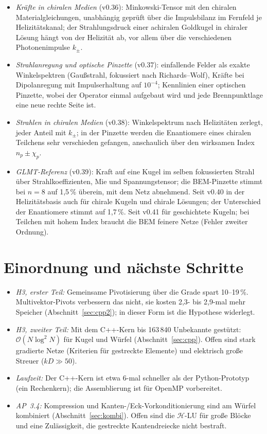 \documentclass[11pt, a4paper]{article}
\begin{document}
\begin{itemize}[leftmargin=*]
    Gold-Dimers aus einer Lösung; die chirale Kraft folgt dem Gradienten der optischen Chiralität mit dem aus der Kraftformel
    erwarteten Faktor auf 0,5\,\%.
  \item \emph{Kräfte in chiralen Medien} (v0.36): Minkowski-Tensor mit den chiralen Materialgleichungen, unabhängig geprüft über
    die Impulsbilanz im Fernfeld je Helizitätskanal; der Strahlungsdruck einer achiralen Goldkugel in chiraler Lösung hängt von
    der Helizität ab, vor allem über die verschiedenen Photonenimpulse $k_\pm$.
  \item \emph{Strahlanregung und optische Pinzette} (v0.37): einfallende Felder als exakte Winkelspektren (Gaußstrahl,
    fokussiert nach Richards--Wolf), Kräfte bei Dipolanregung mit Impulserhaltung auf $10^{-4}$; Kennlinien einer optischen
    Pinzette, wobei der Operator einmal aufgebaut wird und jede Brennpunktlage eine neue rechte Seite ist.
  \item \emph{Strahlen in chiralen Medien} (v0.38): Winkelspektrum nach Helizitäten zerlegt, jeder Anteil mit $k_\pm$; in der
    Pinzette werden die Enantiomere eines chiralen Teilchens sehr verschieden gefangen, anschaulich über den wirksamen Index
    $n_p \pm \chi_p$.
  \item \emph{GLMT-Referenz} (v0.39): Kraft auf eine Kugel im selben fokussierten Strahl über Strahlkoeffizienten, Mie und
    Spannungstensor; die BEM-Pinzette stimmt bei $n = 8$ auf 1,5\,\% überein, mit dem Netz abnehmend. Seit v0.40 in der
    Helizitätsbasis auch für chirale Kugeln und chirale Lösungen; der Unterschied der Enantiomere stimmt auf 1,7\,\%. Seit v0.41
    für geschichtete Kugeln; bei Teilchen mit hohem Index braucht die BEM feinere Netze (Fehler zweiter Ordnung).
\end{itemize}

\section{Einordnung und nächste Schritte}
\begin{itemize}[leftmargin=*]
  \item \emph{H3, erster Teil:} Gemeinsame Pivotisierung über die Grade spart
    10--19\,\%. Multivektor-Pivots verbessern das nicht, sie kosten 2,3- bis 2,9-mal mehr Speicher
    (Abschnitt~\ref{sec:cpp2}); in dieser Form ist die Hypothese widerlegt.
  \item \emph{H3, zweiter Teil:} Mit dem C++-Kern bis 163\,840 Unbekannte gestützt:
    $\mathcal{O}(N\log^2N)$ für Kugel und Würfel (Abschnitt~\ref{sec:cpp}). Offen sind stark
    gradierte Netze (Kriterien für gestreckte Elemente) und elektrisch große Streuer
    ($kD\gg50$).
  \item \emph{Laufzeit:} Der C++-Kern ist etwa 6-mal schneller als der Python-Prototyp
    (ein Rechenkern); die Assemblierung ist für OpenMP vorbereitet.
  \item \emph{AP~3.4:} Kompression und Kanten-/Eck-Vorkonditionierung sind am Würfel
    kombiniert (Abschnitt~\ref{sec:kombi}). Offen sind die $\mathcal{H}$-LU für große Blöcke und
    eine Zulässigkeit, die gestreckte Kantendreiecke nicht bestraft.
\end{itemize}
\end{document}
